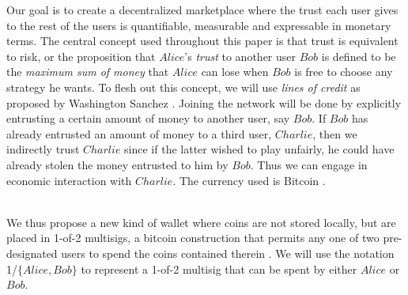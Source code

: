 \documentclass[11pt]{llncs}
\def\bitcoin{%
  \leavevmode
  \vtop{\offinterlineskip %
    \setbox0=\hbox{B}%
    \setbox2=\hbox to\wd0{\hfil\hskip-.03em
    \vrule height .3ex width .15ex\hskip .08em
    \vrule height .3ex width .15ex\hfil}
    \vbox{\copy2\box0}\box2}}
\theoremstyle{definition}
\begin{document}
     Our goal is to create a decentralized marketplace where the trust each user gives to the rest of the users is
     quantifiable, measurable and expressable in monetary terms. The central concept used throughout this paper is
     that trust is equivalent to risk, or the proposition that $Alice$'s \textit{trust} to another user $Bob$ is defined to
     be the \textit{maximum sum of money} that $Alice$ can lose when $Bob$ is free to choose any strategy he wants. To flesh
     out this concept, we will use \textit{lines of credit} as proposed by Washington Sanchez \cite{loc}. Joining the network
     will be done by explicitly entrusting a certain amount of money to another user, say $Bob$. If $Bob$ has already
     entrusted an amount of money to a third user, $Charlie$, then we indirectly trust $Charlie$ since if the latter wished
     to play unfairly, he could have already stolen the money entrusted to him by $Bob$. Thus we can engage in economic
     interaction with $Charlie$. The currency used is Bitcoin \cite{bitcoin}. \medskip \ \\
 \smallskip \ \\
     We thus propose a new kind of wallet where coins are not stored locally, but are placed in 1-of-2 multisigs, a bitcoin
     construction that permits any one of two pre-designated users to spend the coins contained therein \cite{multisig}. We
     will use the notation 1/$\{Alice, Bob\}$ to represent a 1-of-2 multisig that can be spent by either $Alice$ or $Bob$.
\end{document}
